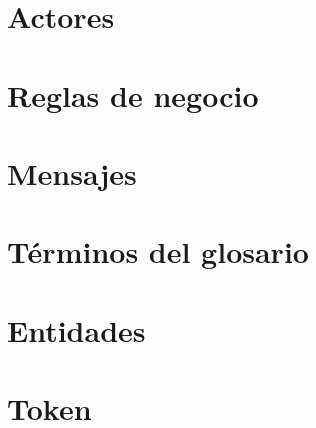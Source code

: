 \documentclass[10pt]{book}
\begin{document}
\chapter{Actores}\label{cap:gestionarActores}
\chapter{Reglas de negocio}\label{cap:gestionarReglasNegocio}
\chapter{Mensajes}\label{cap:gestionarMensajes}
\chapter{Términos del glosario}\label{cap:gestionarTerminos}
\chapter{Entidades}\label{cap:gestionarEntidades}
\chapter{Token}\label{cap:token}
\end{document}
